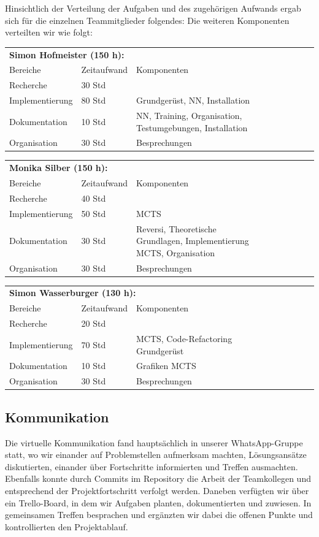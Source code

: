 \documentclass[12pt,a4paper]{article}
\begin{document}
Hinsichtlich der Verteilung der Aufgaben und des zugehörigen Aufwands ergab sich für die einzelnen Teammitglieder folgendes:
Die weiteren Komponenten verteilten wir wie folgt:

\begin{tabular}{*{3}{p{4cm}p{3cm}p{8cm}}}
\multicolumn{3}{l}{\textbf{Simon Hofmeister (150 h):}} \\
Bereiche & Zeitaufwand & Komponenten \\
\cline{1-3}
Recherche & 30 Std &  \\
Implementierung & 80 Std & Grundgerüst, NN, Installation  \\
Dokumentation & 10 Std & NN, Training, Organisation, Testumgebungen, Installation \\
Organisation & 30 Std &  Besprechungen\\
\end{tabular}


\begin{tabular}{*{3}{p{4cm}p{3cm}p{8cm}}}
\multicolumn{3}{l}{\textbf{Monika Silber (150 h):}} \\
Bereiche & Zeitaufwand & Komponenten \\
\cline{1-3}
Recherche & 40 Std &  \\
Implementierung & 50 Std & MCTS  \\
Dokumentation & 30 Std &  Reversi, Theoretische Grundlagen, Implementierung MCTS, Organisation \\
Organisation & 30 Std &  Besprechungen\\
\end{tabular}


\begin{tabular}{*{3}{p{4cm}p{3cm}p{8cm}}}
\multicolumn{3}{l}{\textbf{Simon Wasserburger (130 h):}} \\
Bereiche & Zeitaufwand & Komponenten \\
\cline{1-3}
Recherche & 20 Std &  \\
Implementierung & 70 Std & MCTS, Code-Refactoring Grundgerüst  \\
Dokumentation & 10 Std &  Grafiken MCTS \\
Organisation & 30 Std &  Besprechungen\\
\end{tabular}


\subsection{Kommunikation}
Die virtuelle Kommunikation fand hauptsächlich in unserer WhatsApp-Gruppe statt, wo wir einander auf Problemstellen aufmerksam machten, Lösungsansätze diskutierten, einander über Fortschritte informierten und Treffen ausmachten. Ebenfalls konnte durch Commits im Repository die Arbeit der Teamkollegen und entsprechend der Projektfortschritt verfolgt werden. Daneben verfügten wir über ein Trello-Board, in dem wir Aufgaben planten, dokumentierten und zuwiesen. In gemeinsamen Treffen besprachen und ergänzten wir dabei die offenen Punkte und kontrollierten den Projektablauf. 
\end{document}
